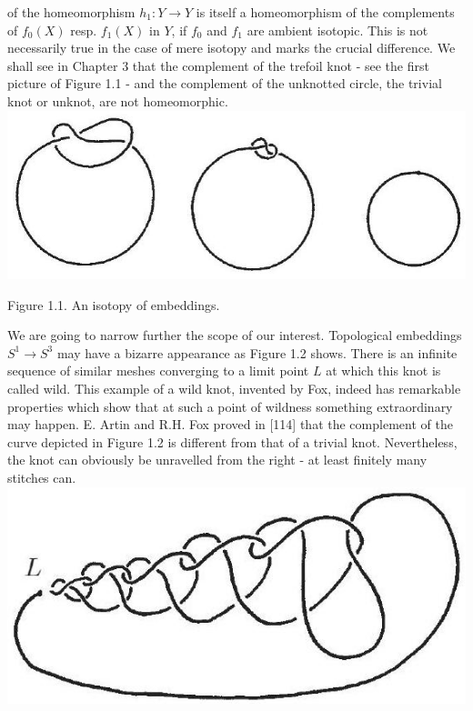 \documentclass[10pt, letterpaper]{article}
\begin{document}
of the homeomorphism $h_{1}: Y \rightarrow Y$ is itself a homeomorphism of the complements of $f_{0}(X)$ resp. $f_{1}(X)$ in $Y$, if $f_{0}$ and $f_{1}$ are ambient isotopic. This is not necessarily true in the case of mere isotopy and marks the crucial difference. We shall see in Chapter 3 that the complement of the trefoil knot - see the first picture of Figure 1.1 - and the complement of the unknotted circle, the trivial knot or unknot, are not homeomorphic.\\
\includegraphics[scale=0.2, center]{2025_05_21_9c06be8de7a55410f8c1g-016}

Figure 1.1. An isotopy of embeddings.

We are going to narrow further the scope of our interest. Topological embeddings $S^{1} \rightarrow S^{3}$ may have a bizarre appearance as Figure 1.2 shows. There is an infinite sequence of similar meshes converging to a limit point $L$ at which this knot is called wild. This example of a wild knot, invented by Fox, indeed has remarkable properties which show that at such a point of wildness something extraordinary may happen. E. Artin and R.H. Fox proved in [114] that the complement of the curve depicted in Figure 1.2 is different from that of a trivial knot. Nevertheless, the knot can obviously be unravelled from the right - at least finitely many stitches can.\\
\includegraphics[scale=0.2, center]{2025_05_21_9c06be8de7a55410f8c1g-017}
\end{document}
